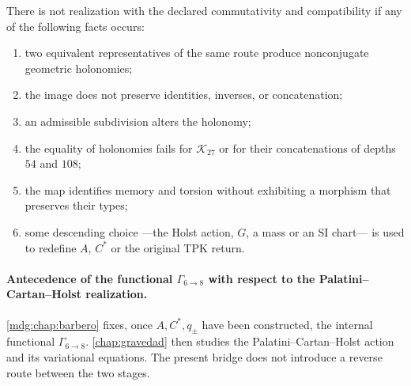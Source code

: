 \begin{criterion}
\label{crit:puente-tpk-cartan}
There is not realization with the declared commutativity and compatibility
if any of the following facts occurs:
\begin{enumerate}
 \item two equivalent representatives of the same route produce
 nonconjugate geometric holonomies;
 \item the image does not preserve identities, inverses, or concatenation;
 \item an admissible subdivision alters the holonomy;
 \item the equality of holonomies fails for \(\mathcal K_{27}\) or for their
 concatenations of depths \(54\) and \(108\);
 \item the map identifies memory and torsion without exhibiting a morphism that
 preserves their types;
 \item some descending choice ---the Holst action, \(G\), a mass or
 an SI chart--- is used to redefine \(A\), \(C^\ast\) or the original
 TPK return.
\end{enumerate}
\end{criterion}

\paragraph{Antecedence of the functional \(\Gamma_{6\to8}\) with respect to the Palatini--Cartan--Holst realization.}
\cref{mdg:chap:barbero} fixes, once \(A,C^\ast,q_\pm\) have been constructed, the
internal functional \(\Gamma_{6\to8}\). \cref{chap:gravedad} then studies
the Palatini--Cartan--Holst action and its variational equations. The present
bridge does not introduce a reverse route between the two stages.
